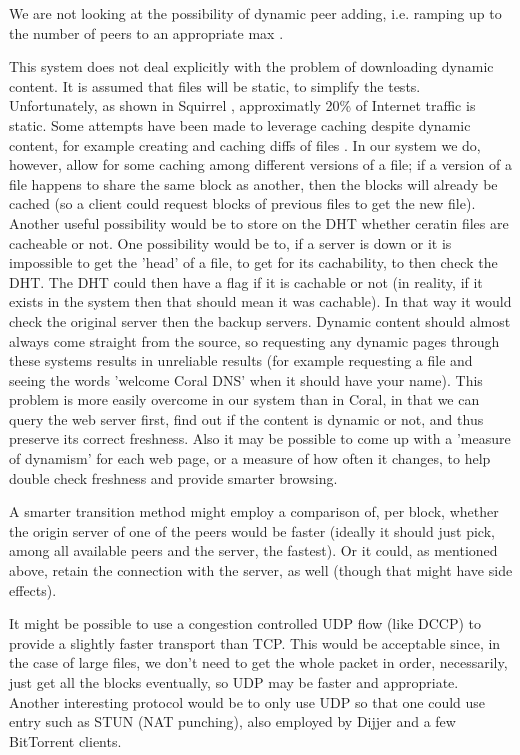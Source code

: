 We are not looking at the possibility of dynamic peer adding, i.e. ramping up to the number of peers to an appropriate max \cite{slurpie, bullet_prime}.

This system does not deal explicitly with the problem of downloading dynamic content.  It is assumed that files will be static, to simplify the tests.  Unfortunately, as shown in Squirrel \cite{squirrel}, approximatly 20\% of Internet traffic is static.  Some attempts have been made to leverage caching despite dynamic content, for example creating and caching diffs of files \cite{google_cache}.  In our system we do, however, allow for some caching among different versions of a file; if a version of a file happens to share the same block as another, then the blocks will already be cached (so a client could request blocks of previous files to get the new file).  Another useful possibility would be to store on the DHT whether ceratin files are cacheable or not.  One possibility would be to, if a server is down or it is impossible to get the 'head' of a file, to get for its cachability, to then check the DHT.  The DHT could then have a flag if it is cachable or not (in reality, if it exists in the system then that should mean it was cachable).  In that way it would check the original server then the backup servers. %
Dynamic content should almost always come straight from the source, so requesting any dynamic pages through these systems results in unreliable results (for example requesting a file and seeing the words 'welcome Coral DNS' when it should have your name).  This problem is more easily overcome in our system than in Coral, in that we can query the web server first, find out if the content is dynamic or not, and thus preserve its correct freshness.  Also it may be possible to come up with a 'measure of  dynamism' for each web page, or a measure of how often it changes, to help double check freshness and provide smarter browsing.

A smarter transition method might employ a comparison of, per block, whether the origin server of one of the peers would be faster (ideally it should just pick, among all available peers and the server, the fastest).  Or it could, as mentioned above, retain the connection with the server, as well (though that might have side effects).

It might be possible to use a congestion controlled UDP flow (like DCCP) to provide a slightly faster transport than TCP.  This would be acceptable since, in the case of large files, we don't need to get the whole packet in order, necessarily, just get all the blocks eventually, so UDP may be faster and appropriate.  Another interesting protocol would be to only use UDP so that one could use entry such as STUN (NAT punching), also employed by Dijjer and a few BitTorrent clients. %

